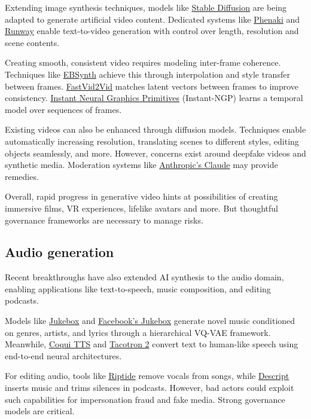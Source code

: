 Extending image synthesis techniques, models like \href{https://arxiv.org/abs/2105.05233}{Stable Diffusion} are being adapted to generate artificial video content. Dedicated systems like \href{https://www.anthropic.com/research/phenaki}{Phenaki} and \href{https://runwayml.com}{Runway} enable text-to-video generation with control over length, resolution and scene contents.

Creating smooth, consistent video requires modeling inter-frame coherence. Techniques like \href{https://ebsynth.com}{EBSynth} achieve this through interpolation and style transfer between frames. \href{https://www.fastvideoai.com}{FastVid2Vid} matches latent vectors between frames to improve consistency. \href{https://nvlabs.github.io/instant-ngp}{Instant Neural Graphics Primitives} (Instant-NGP) learns a temporal model over sequences of frames.

Existing videos can also be enhanced through diffusion models. Techniques enable automatically increasing resolution, translating scenes to different styles, editing objects seamlessly, and more. However, concerns exist around deepfake videos and synthetic media. Moderation systems like \href{https://www.anthropic.com}{Anthropic's Claude} may provide remedies.

Overall, rapid progress in generative video hints at possibilities of creating immersive films, VR experiences, lifelike avatars and more. But thoughtful governance frameworks are necessary to manage risks.

\subsection{Audio generation}

Recent breakthroughs have also extended AI synthesis to the audio domain, enabling applications like text-to-speech, music composition, and editing podcasts.

Models like \href{https://jukebox.openai.com/}{Jukebox} and \href{https://github.com/ facebookresearch/jukebox}{Facebook's Jukebox} generate novel music conditioned on genres, artists, and lyrics through a hierarchical VQ-VAE framework. Meanwhile, \href{https://github.com/coqui-ai/TTS}{Coqui TTS} and \href{https://github.com/NVIDIA/tacotron2}{Tacotron 2} convert text to human-like speech using end-to-end neural architectures.

For editing audio, tools like \href{https://riptide.ai/}{Riptide} remove vocals from songs, while \href{https://www.descript.com/}{Descript} inserts music and trims silences in podcasts. However, bad actors could exploit such capabilities for impersonation fraud and fake media. Strong governance models are critical.

